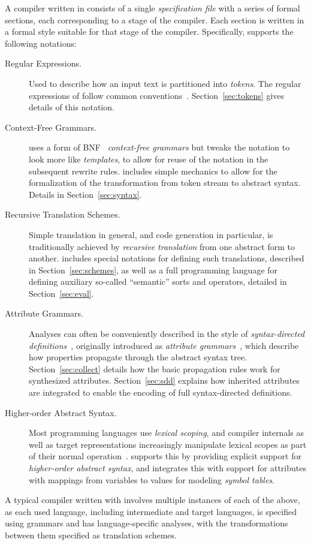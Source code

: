 \documentclass[11pt]{article} %
\begin{document}
A compiler written in \HAX consists of a single \emph{specification file} with a series of formal
sections, each corresponding to a stage of the compiler.  Each section is written in a formal style
suitable for that stage of the compiler. Specifically, \HAX supports the following notations:
\begin{description}

\item[Regular Expressions.] Used to describe how an input text is partitioned into
  \emph{tokens}. The regular expressions of \HAX follow common
  conventions~\cite{Aho+:2006}. Section~\ref{sec:tokens} gives details of this notation.

\item[Context-Free Grammars.] \HAX uses a form of BNF~\cite{NaurEtal:cacm1960} \emph{context-free
    grammars} but tweaks the notation to look more like \emph{templates}, to allow for reuse of the
  notation in the subsequent rewrite rules. \HAX includes simple mechanics to allow for the
  formalization of the transformation from token stream to abstract syntax. Details in
  Section~\ref{sec:syntax}.

\item[Recursive Translation Schemes.] Simple translation in general, and code generation in
  particular, is traditionally achieved by \emph{recursive translation} from one abstract form to
  another.  \HAX includes special notations for defining such translations, described in
  Section~\ref{sec:schemes}, as well as a full programming language for defining auxiliary so-called
  ``semantic'' sorts and operators, detailed in Section~\ref{sec:eval}.

\item[Attribute Grammars.] Analyses can often be conveniently described in the style of
  \emph{syntax-directed definitions}~\cite{Aho+:2006}, originally introduced as \emph{attribute
    grammars}~\cite{Knuth:mst1968}, which describe how properties propagate through the abstract
  syntax tree.  Section~\ref{sec:collect} details how the basic propagation rules work for
  synthesized attributes. Section~\ref{sec:sdd} explains how inherited attributes are integrated to
  enable the encoding of full syntax-directed definitions.

\item[Higher-order Abstract Syntax.] Most programming languages use \emph{lexical scoping}, and
  compiler internals as well as target representations increasingly manipulate lexical scopes as part
  of their normal operation~\cite{MarlowPeyton-Jones:2010,Morrisett+:popl1998}. \HAX supports this
  by providing explicit support for \emph{higher-order abstract syntax}, and integrates this with
  support for attributes with mappings from variables to values for modeling \emph{symbol tables}.

\end{description}
A typical compiler written with \HAX involves multiple instances of each of the above, as each used
language, including intermediate and target languages, is specified using grammars and has
language-specific analyses, with the transformations between them specified as translation schemes.
\end{document}

